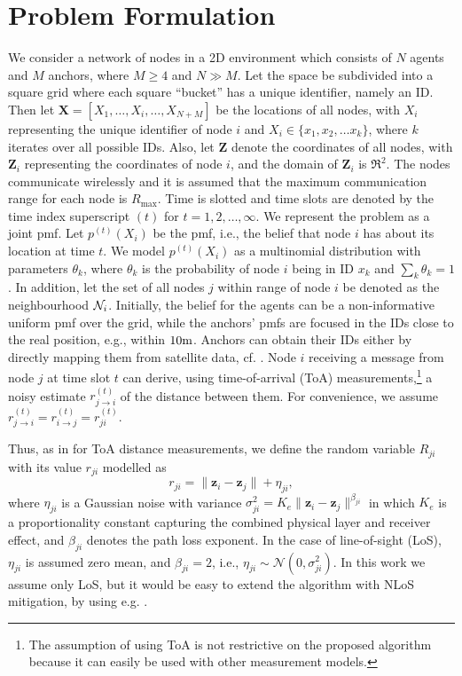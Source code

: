 \documentclass[10pt, final, journal]{IEEEtran}
\begin{document}
\section{Problem Formulation}\label{problemformulation}
We consider a network of nodes in a 2D environment which consists of $N$ agents and $M$ anchors, where $M\geq 4$ and $N \gg M$.  Let the space be subdivided into a square grid where each square ``bucket'' has a unique identifier, namely an ID. Then let $\bm X=[{X}_1,\dots,{X}_i,\dots,{X}_{N+M}] $ be the locations of all nodes,  with ${X}_{i}$ representing the unique identifier of node $i$ and $X_i \in \{x_1,x_2, \ldots x_k \}$, where $k$ iterates over all possible IDs. Also, let $\bm Z$ denote the coordinates of all nodes, with $\bm{Z}_{i}$ representing the coordinates of node $i$,  and the domain of $\bm{Z}_i$ is $\Re^2$.
The nodes communicate wirelessly and it is assumed that the maximum communication range for each node is $R_{\max}$. Time is slotted and time slots are denoted by the time index superscript $(t)$ for $t=1,2,\dots,\infty$. We represent the problem as a joint pmf. Let $p^{(t)}(X_{i})$ be the pmf, i.e., the belief that node $i$ has about its location at time $t$.  We model  $p^{(t)}(X_{i})$  as a multinomial distribution with parameters $\theta_k$, where $\theta_{k}$ is the probability of node $i$ being in ID $x_{k}$ and $\sum_{k}\theta_{k}=1$. In addition, let the set of all nodes $j$  within range of node $i$ be denoted as the  neighbourhood ${\cal N}_{i}$. Initially, the  belief for the agents can be a non-informative uniform pmf over the grid, while the anchors' pmfs are focused in the IDs close to the real position, e.g., within $10{\rm m}$. Anchors can obtain their IDs either by directly mapping them from satellite data, cf. \cite{ngamgrs}. Node $i$ receiving a message from node $j$ at time slot $t$ can derive, using time-of-arrival (ToA) measurements,\footnote{The assumption of using ToA is not restrictive on the proposed algorithm because it can easily be used with other measurement models.} a noisy estimate $r^{(t)}_{j\rightarrow i}$ of the distance between them. For convenience, we assume $r^{(t)}_{j\rightarrow i}=r^{(t)}_{i \rightarrow j}= r^{(t)}_{ji}$.

Thus, as in \cite{Buehrer:2010ew} for ToA distance measurements, we define the random variable $R_{ji}$ with its value $r_{ji}$ modelled as
\begin{equation}
r_{ji}=\| \bm{z}_i-\bm{z}_j\|+\eta_{ji},
\end{equation}
where $\eta_{ji}$ is a Gaussian noise with variance $\sigma^{2}_{ji}=K_{e}\|\bm{z}_i -\bm{z}_j\|^{\beta_{ji}}$ in which $K_{e}$ is a proportionality constant capturing the combined physical layer and receiver effect, and $\beta_{ji}$ denotes the path loss exponent. In the case of line-of-sight (LoS), $\eta_{ji}$ is assumed zero mean, and $\beta_{ji}=2$, i.e., $\eta_{ji} \sim \mathcal{N}(0, \sigma^{2}_{ji})$. In this work we assume only LoS, but it would be easy to extend the algorithm with NLoS mitigation, by using e.g. \cite{oikonomou2011hybrid,Yin:2015}.
\end{document}
